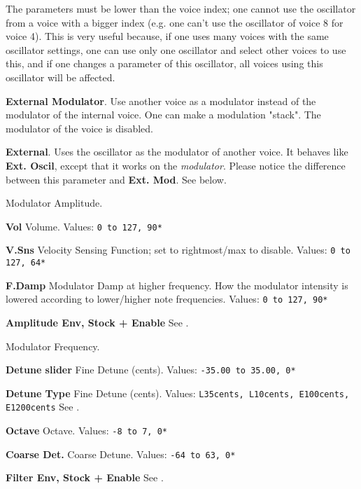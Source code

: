    The parameters must be lower than the voice index; one cannot use the
   oscillator from a voice with a bigger index (e.g. one can't use the
   oscillator of voice 8 for voice 4). This is very useful because, if
   one uses many voices with the same oscillator settings, one can use only
   one oscillator and select other voices to use this, and if one changes a
   parameter of this oscillator, all voices using this oscillator will be
   affected.

   \textbf{External Modulator}.
   Use another voice as a modulator instead of the modulator of the internal
   voice. One can make a modulation "stack". The modulator of the voice is
   disabled. 

   \textbf{External}.
   Uses the oscillator as the modulator of another voice. It
   behaves like \textbf{Ext. Oscil}, except that it works on the
   \textsl{modulator}. Please
   notice the difference between this parameter and \textbf{Ext. Mod}. 
   See below.

   Modulator Amplitude.

   \begin{enumber}
      \item \textbf{Vol}
         Volume.
         Values: \texttt{0 to 127, 90*}
      \item \textbf{V.Sns}
         Velocity Sensing Function; set to rightmost/max to disable.
         Values: \texttt{0 to 127, 64*}
      \item \textbf{F.Damp}
         Modulator Damp at higher frequency.
         How the modulator intensity is lowered according to lower/higher
         note frequencies. 
         Values: \texttt{0 to 127, 90*}
      \item \textbf{Amplitude Env, Stock + Enable}
         See .
   \end{enumber}

   Modulator Frequency.

   \begin{enumber}
      \item \textbf{Detune slider}
         Fine Detune (cents).
         Values: \texttt{-35.00 to 35.00, 0*}
      \item \textbf{Detune Type}
         Fine Detune (cents).
         Values: \texttt{L35cents, L10cents, E100cents, E1200cents}
         See .
      \item \textbf{Octave}
         Octave.
         Values: \texttt{-8 to 7, 0*}
      \item \textbf{Coarse Det.}
         Coarse Detune.
         Values: \texttt{-64 to 63, 0*}
      \item \textbf{Filter Env, Stock + Enable}
         See .
   \end{enumber}

